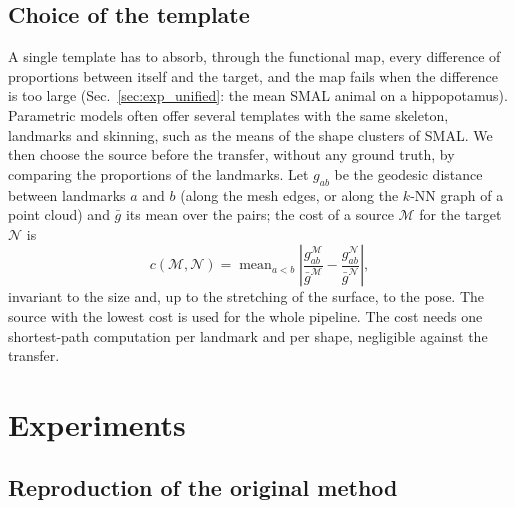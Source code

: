 \documentclass[11pt]{article}
\newcommand{\M}{\mathcal{M}}
\newcommand{\N}{\mathcal{N}}
\begin{document}
\subsection{Choice of the template}
\label{sec:templates}
A single template has to absorb, through the functional map, every difference
of proportions between itself and the target, and the map fails when the
difference is too large (Sec.~\ref{sec:exp_unified}: the mean SMAL animal on
a hippopotamus). Parametric models often offer several templates with the
same skeleton, landmarks and skinning, such as the means of the shape
clusters of SMAL. We then choose the source before the transfer, without any
ground truth, by comparing the proportions of the landmarks. Let $g_{ab}$ be
the geodesic distance between landmarks $a$ and $b$ (along the mesh edges, or
along the $k$-NN graph of a point cloud) and $\bar g$ its mean over the pairs;
the cost of a source $\M$ for the target $\N$ is
\begin{equation}
  c(\M, \N) = \operatorname{mean}_{a < b} \left| \frac{g^\M_{ab}}{\bar g^\M}
    - \frac{g^\N_{ab}}{\bar g^\N} \right|,
\end{equation}
invariant to the size and, up to the stretching of the surface, to the pose.
The source with the lowest cost is used for the whole pipeline. The cost
needs one shortest-path computation per landmark and per shape, negligible
against the transfer.

\section{Experiments}
\label{sec:experiments}

\subsection{Reproduction of the original method}
\label{sec:exp_parity}
\end{document}
